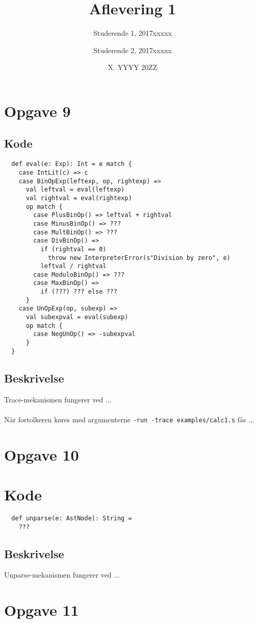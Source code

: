 \documentclass[a4paper, 10pt]{article}
\title{Aflevering 1}
\author{Studerende 1, 2017xxxxx \and Studerende 2, 2017xxxxx}
\date{X. YYYY 20ZZ}
\begin{document}
\maketitle
\section*{Opgave 9}
\subsection*{Kode}
\begin{lstlisting}
  def eval(e: Exp): Int = e match {
    case IntLit(c) => c
    case BinOpExp(leftexp, op, rightexp) =>
      val leftval = eval(leftexp)
      val rightval = eval(rightexp)
      op match {
        case PlusBinOp() => leftval + rightval
        case MinusBinOp() => ???
        case MultBinOp() => ???
        case DivBinOp() =>
          if (rightval == 0)
            throw new InterpreterError(s"Division by zero", e)
          leftval / rightval
        case ModuloBinOp() => ???
        case MaxBinOp() =>
          if (???) ??? else ???
      }
    case UnOpExp(op, subexp) =>
      val subexpval = eval(subexp)
      op match {
        case NegUnOp() => -subexpval
      }
  }
\end{lstlisting}
\subsection*{Beskrivelse}
Trace-mekanismen fungerer ved ... \\
\\
Når fortolkeren køres med argumenterne \texttt{-run -trace examples/calc1.s} fås ...
\section*{Opgave 10}
\section*{Kode}
\begin{lstlisting}
  def unparse(e: AstNode): String =
    ???
\end{lstlisting}
\subsection*{Beskrivelse}
Unparse-mekanismen fungerer ved ...
\section*{Opgave 11}
\end{document}
